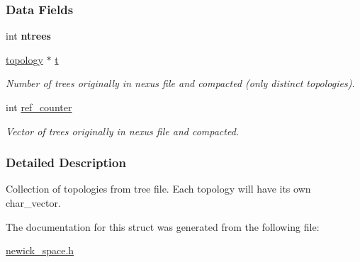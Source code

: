 \subsubsection*{Data Fields}
\begin{DoxyCompactItemize}
\item 
\mbox{\label{structnewick__space__struct_a9b7dd85f23e54a5aed85b5b1261673e8}} 
int {\bfseries ntrees}
\item 
\mbox{\label{structnewick__space__struct_a08853acc734ac5d8da8f37d4f57cbe84}} 
\hyperlink{structtopology__struct}{topology} $\ast$ \hyperlink{structnewick__space__struct_a08853acc734ac5d8da8f37d4f57cbe84}{t}
\begin{DoxyCompactList}\small\item\em Number of trees originally in nexus file and compacted (only distinct topologies). \end{DoxyCompactList}\item 
\mbox{\label{structnewick__space__struct_ae4fdbf837e78c6116d54028686daf664}} 
int \hyperlink{structnewick__space__struct_ae4fdbf837e78c6116d54028686daf664}{ref\+\_\+counter}
\begin{DoxyCompactList}\small\item\em Vector of trees originally in nexus file and compacted. \end{DoxyCompactList}\end{DoxyCompactItemize}


\subsubsection{Detailed Description}
Collection of topologies from tree file. Each topology will have its own char\+\_\+vector. 

The documentation for this struct was generated from the following file\+:\begin{DoxyCompactItemize}
\item 
\hyperlink{newick__space_8h}{newick\+\_\+space.\+h}\end{DoxyCompactItemize}
